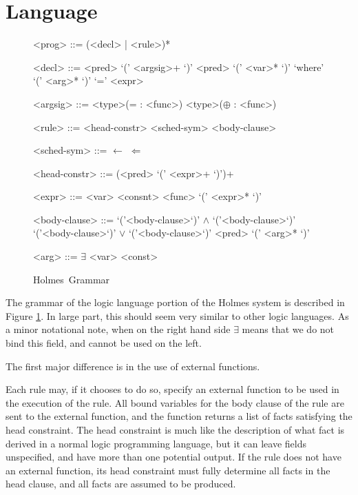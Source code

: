 \documentclass{article}
\newcommand{\sysname}{Holmes}
\begin{document}
\section{Language}
\begin{figure}
\begin{grammar}

<prog> ::= (<decl> | <rule>)*

<decl> ::= <pred> `(' <argsig>+ `)'
\alt <pred> `(' <var>* `)' `where' `(' <arg>* `)' `=' <expr>

<argsig>
::=  <type>(= : <func>)
\alt <type>($\oplus$ : <func>)

<rule> ::= <head-constr> <sched-sym> <body-clause>

<sched-sym> ::= $\leftarrow$
\alt $\Leftarrow$

<head-constr> ::= (<pred> `(' <expr>+ `)')+

<expr> ::= <var>
\alt <consnt>
\alt <func> `(' <expr>* `)'

<body-clause>
::=  `('<body-clause>`)' $\wedge$ `('<body-clause>`)'
\alt `('<body-clause>`)' $\vee$ `('<body-clause>`)'
\alt <pred> `(' <arg>* `)'

<arg> ::= $\exists$ \alt <var> \alt <const>
\end{grammar}
\label{fig:holmesGrammar}
\caption{\sysname\ Grammar}
\end{figure}
The grammar of the logic language portion of the Holmes system is described in  Figure \ref{fig:holmesGrammar}.
In large part, this should seem very similar to other logic languages.
As a minor notational note, when on the right hand side $\exists$ means that we do not bind this field, and cannot be used on the left.

The first major difference is in the use of external functions.


Each rule may, if it chooses to do so, specify an external function to be used in the execution of the rule.
All bound variables for the body clause of the rule are sent to the external function, and the function returns a list of facts satisfying the head constraint.
The head constraint is much like the description of what fact is derived in a normal logic programming language, but it can leave fields unspecified, and have more than one potential output.
If the rule does not have an external function, its head constraint must fully determine all facts in the head clause, and all facts are assumed to be produced.
\end{document}
